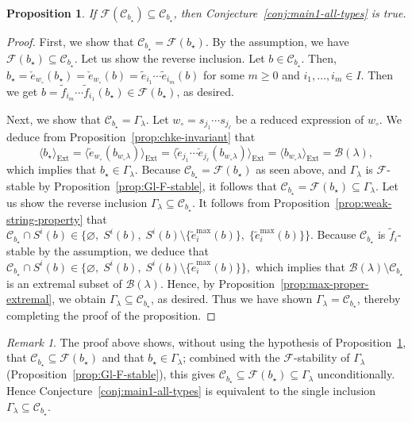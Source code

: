 \documentclass[reqno]{amsart}
\newtheorem{proposition}[theorem]{Proposition}
\theoremstyle{definition}
\theoremstyle{remark}
\newtheorem{remark}[theorem]{Remark}
\numberwithin{equation}{section}
\newcommand{\B}{\mathcal{B}}
\newcommand{\F}{\mathcal{F}}
\newcommand{\Ext}{\operatorname{Ext}}
\newcommand{\Gl}{\Gamma_\lambda}
\newcommand{\wo}{w_\circ}
\newcommand{\te}{\tilde e}
\newcommand{\tf}{\tilde f}
\newcommand{\chke}{\check e}
\newcommand{\bstar}{b_\star}
\newcommand{\Bl}{\B(\lambda)}
\begin{document}
	\begin{proposition}\label{prop:reduction}
		If $\F(\mathcal{C}_{b_\star})\subseteq\mathcal{C}_{b_\star}$,
		then Conjecture~\ref{conj:main1-all-types} is true.
	\end{proposition}
	\begin{proof}
		First, we show that $\mathcal{C}_{\bstar}=\F(\bstar)$.
		By the assumption, we have $\F(\bstar)\subseteq \mathcal{C}_{\bstar}.$
		Let us show the reverse inclusion.
		Let $b\in \mathcal{C}_{b_{\star}}$.
		Then, $b_{\star}=\chke_{w_\circ}(b_{\star})=\chke_{w_\circ}(b)=\te_{i_1}\cdots\te_{i_m}(b)$
		for some $m\ge0$ and $i_1,\dots,i_m\in I$.
		Then we get $b=\tf_{i_m}\cdots\tf_{i_1}(b_\star)\in \F(b_\star)$, as desired.
		
		Next, we show that $\mathcal{C}_{\bstar}=\Gl$. 
		Let $w_\circ=s_{j_1}\cdots s_{j_\ell}$ be a reduced expression of $w_\circ$.
		We deduce from Proposition~\ref{prop:chke-invariant} that
		\[
		\langle\bstar\rangle_{\Ext}=
		\langle\chke_{w_\circ}(b_{w_\circ\lambda})\rangle_{\Ext}=
		\langle\chke_{j_1}\cdots\chke_{j_\ell}(b_{w_\circ\lambda})\rangle_{\Ext}=
		\langle b_{\wo\lambda}\rangle_{\Ext}=\Bl,
		\]
		which implies that $\bstar\in\Gl$.
		Because $\mathcal{C}_{\bstar}=\F(\bstar)$ as seen above, and $\Gl$ is $\F$-stable by Proposition~\ref{prop:Gl-F-stable},
		it follows that $\mathcal{C}_{\bstar}=\F(\bstar)\subseteq\Gl$.
		Let us show the reverse inclusion $\Gl\subseteq \mathcal{C}_{\bstar}$.
		It follows from Proposition~\ref{prop:weak-string-property} that
		$\mathcal{C}_{\bstar}\cap S^i(b)\in\{\varnothing,\;S^i(b),\;
		S^i(b)\setminus\{\te_i^{\max}(b)\},\;\{\te_i^{\max}(b)\}\}.$
		Because $\mathcal{C}_{\bstar}$ is $\tf_i$-stable by the assumption,
		we deduce that 
		$\mathcal{C}_{\bstar}\cap S^i(b)\in\{\varnothing,\; S^i(b),\;S^i(b)\setminus\{\te_i^{\max}(b)\}\},$
		which implies that
		$\Bl\setminus \mathcal{C}_{\bstar}$ is an extremal subset of $\Bl$.
		Hence, by Proposition~\ref{prop:max-proper-extremal}, we obtain $\Gl\subseteq \mathcal{C}_{\bstar}$, as desired.
		Thus we have shown $\Gl=\mathcal{C}_{\bstar}$,
		thereby completing the proof of the proposition.
	\end{proof}

	\begin{remark}\label{rem:conj-equiv-inclusion}
		The proof above shows, without using the hypothesis of Proposition~\ref{prop:reduction}, that
		$\mathcal{C}_{\bstar}\subseteq\F(\bstar)$ and that $\bstar\in\Gl$;
		combined with the $\F$-stability of $\Gl$ (Proposition~\ref{prop:Gl-F-stable}), this gives
		$\mathcal{C}_{\bstar}\subseteq\F(\bstar)\subseteq\Gl$ unconditionally.
		Hence Conjecture~\ref{conj:main1-all-types} is equivalent to the single inclusion $\Gl\subseteq\mathcal{C}_{\bstar}$.
	\end{remark}
\end{document}
